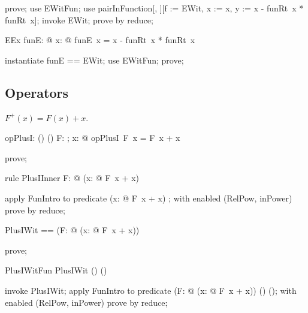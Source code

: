 \documentclass{article}
\begin{document}
\begin{zproof}
prove;
use EWitFun;
use pairInFunction[\nat, \nat][f := EWit, x := x, y := x - funRt~x * funRt~x];
invoke EWit;
prove by reduce;
\end{zproof}

\begin{theorem}{EEx}
  \exists funE: \nat \fun \nat @ \forall x: \nat @ funE~x = x - funRt~x * funRt~x
\end{theorem}

\begin{zproof}
instantiate funE == EWit;
use EWitFun;
prove;
\end{zproof}

\subsection{Operators}

$F^+(x) = F(x) + x$.

\begin{axdef}
  opPlusI: (\nat \fun \nat) \fun (\nat \fun \nat)
\where
   \forall F: \nat \fun \nat; x: \nat @ opPlusI~F~x = F~x + x
\end{axdef}

\begin{zproof}
prove;
\end{zproof}

\begin{theorem}{rule PlusIInner}
  \forall F: \nat \fun \nat @ (\lambda x: \nat @ F~x + x) \in \nat \fun \nat
\end{theorem}

\begin{zproof}
apply FunIntro to predicate (\lambda x: \nat @ F~x + x) \in \nat \fun \nat;
with enabled (RelPow, inPower) prove by reduce;
\end{zproof}

\begin{zed}
  PlusIWit == (\lambda F: \nat \fun \nat @ (\lambda x: \nat @ F~x + x))
\end{zed}

\begin{zproof}
prove;
\end{zproof}

\begin{theorem}{PlusIWitFun}
  PlusIWit \in (\nat \fun \nat) \fun (\nat \fun \nat)
\end{theorem}

\begin{zproof}
invoke PlusIWit;
apply FunIntro to predicate (\lambda F: \nat \fun \nat @ (\lambda x: \nat @ F~x + x)) \in (\nat \fun \nat) \fun (\nat \fun \nat);
with enabled (RelPow, inPower) prove by reduce;
\end{zproof}
\end{document}

